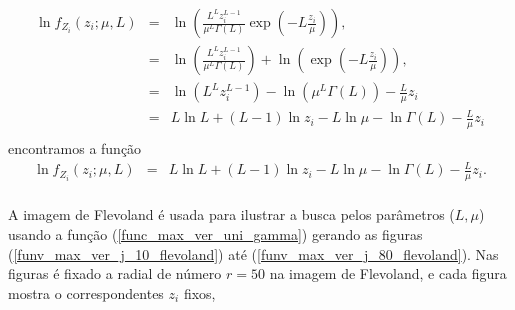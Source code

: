 \documentclass[journal,article,submit,moreauthors,pdftex]{Definitions/mdpi}
\begin{document}
\begin{equation}\nonumber
\begin{array}{ccc}
	\ln f_{Z_{i}}(z_{i};\mu,L)&=&\ln \left(\frac{L^{L}z_{i}^{L-1}}{\mu^{L}\Gamma(L)} \exp\left(-L\frac{z_{i}}{\mu}\right)\right), \\
	                                         &=&\ln \left(\frac{L^{L}z_{i}^{L-1}}{\mu^{L}\Gamma(L)}\right) + \ln\left(\exp\left(-L\frac{z_{i}}{\mu}\right)\right), \\
	                                         &=&\ln \left(L^{L}z_{i}^{L-1} \right)-\ln\left(\mu^{L}\Gamma(L)\right) -\frac{L}{\mu} z_i\\
	                                         &=&L\ln L +(L - 1) \ln z_{i}-L \ln \mu-\ln \Gamma(L) -\frac{L}{\mu} z_i\\
\end{array}
\end{equation}
encontramos a função
\begin{equation}\label{func_max_ver_uni_gamma}
\begin{array}{ccc}
	\ln f_{Z_{i}}(z_{i};\mu,L)&=& L\ln L +(L - 1) \ln z_{i}-L \ln \mu-\ln \Gamma(L) -\frac{L}{\mu} z_i.\\
\end{array}
\end{equation}

A imagem de Flevoland é usada para ilustrar a busca pelos parâmetros ($L, \mu$) usando a função (\ref{func_max_ver_uni_gamma}) gerando as figuras (\ref{funv_max_ver_j_10_flevoland}) até (\ref{funv_max_ver_j_80_flevoland}). Nas figuras é fixado a radial de número $r=50$ na imagem de Flevoland, e cada figura mostra o correspondentes $z_i$ fixos,  
\end{document}
